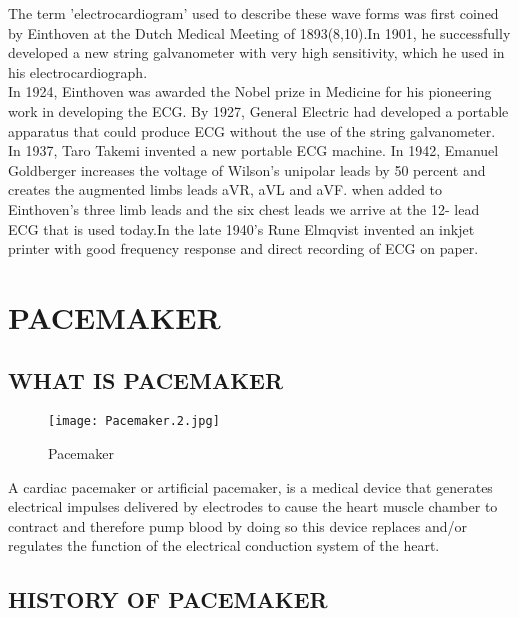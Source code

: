 \documentclass[12pt]{article}
\begin{document}
{\large The term 'electrocardiogram' used to describe these wave forms was first coined by Einthoven at the Dutch Medical Meeting of 1893(8,10).In 1901, he successfully developed a new string galvanometer with very high sensitivity, which he used in his electrocardiograph. \\ In 1924, Einthoven was awarded the Nobel prize in Medicine for his pioneering work in developing the ECG. By 1927, General Electric had developed a portable apparatus that could produce ECG without the use of the string galvanometer. In 1937, Taro Takemi invented a new portable ECG machine. In 1942, Emanuel Goldberger increases the voltage of Wilson's unipolar leads by 50 percent and creates the augmented limbs leads aVR, aVL and aVF. when added to Einthoven's three limb leads and the six chest leads we arrive at the 12- lead ECG that is used today.In the late 1940's Rune Elmqvist invented an inkjet printer with good frequency response and direct recording of ECG on paper.}







\section{PACEMAKER}




\subsection{WHAT IS PACEMAKER}



\begin{figure}[h]
\centering
\texttt{[image: Pacemaker.2.jpg]}
\caption{Pacemaker}
\end{figure}



{\large A cardiac pacemaker or artificial pacemaker, is a medical device that generates electrical impulses delivered by electrodes to cause the heart muscle chamber to contract and therefore pump blood by doing so this device replaces and/or regulates the function of the electrical conduction system of the heart.}





\subsection{HISTORY OF PACEMAKER}
\end{document}
